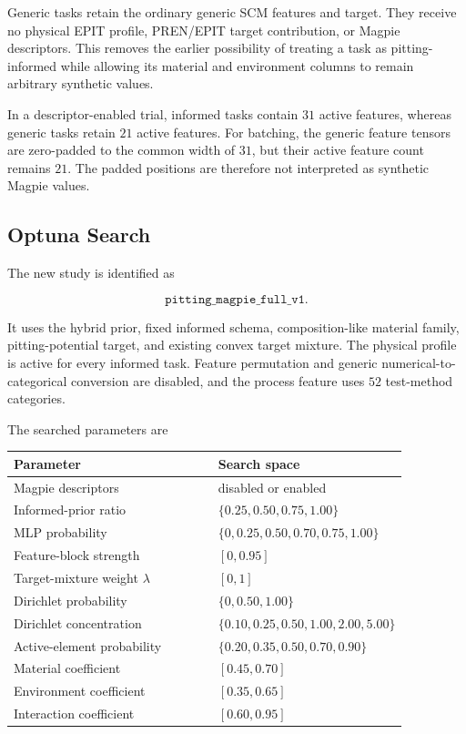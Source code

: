 \documentclass{article}
\begin{document}
Generic tasks retain the ordinary generic SCM features and target. They receive
no physical EPIT profile, PREN/EPIT target contribution, or Magpie descriptors.
This removes the earlier possibility of treating a task as pitting-informed
while allowing its material and environment columns to remain arbitrary
synthetic values.

In a descriptor-enabled trial, informed tasks contain \(31\) active features,
whereas generic tasks retain \(21\) active features. For batching, the generic
feature tensors are zero-padded to the common width of \(31\), but their active
feature count remains \(21\). The padded positions are therefore not interpreted
as synthetic Magpie values.

\subsection{Optuna Search}

The new study is identified as

\[
\texttt{pitting\_magpie\_full\_v1}.
\]

It uses the hybrid prior, fixed informed schema, composition-like material
family, pitting-potential target, and existing convex target mixture. The
physical profile is active for every informed task. Feature permutation and
generic numerical-to-categorical conversion are disabled, and the process
feature uses \(52\) test-method categories.

The searched parameters are

\begin{center}
\small
\begin{tabular}{p{0.52\linewidth}p{0.34\linewidth}}
\hline
\textbf{Parameter} & \textbf{Search space} \\
\hline
Magpie descriptors
& disabled or enabled \\
Informed-prior ratio
& \(\{0.25,0.50,0.75,1.00\}\) \\
MLP probability
& \(\{0,0.25,0.50,0.70,0.75,1.00\}\) \\
Feature-block strength
& \([0,0.95]\) \\
Target-mixture weight \(\lambda\)
& \([0,1]\) \\
Dirichlet probability
& \(\{0,0.50,1.00\}\) \\
Dirichlet concentration
& \(\{0.10,0.25,0.50,1.00,2.00,5.00\}\) \\
Active-element probability
& \(\{0.20,0.35,0.50,0.70,0.90\}\) \\
Material coefficient
& \([0.45,0.70]\) \\
Environment coefficient
& \([0.35,0.65]\) \\
Interaction coefficient
& \([0.60,0.95]\) \\
\hline
\end{tabular}
\end{center}
\end{document}
